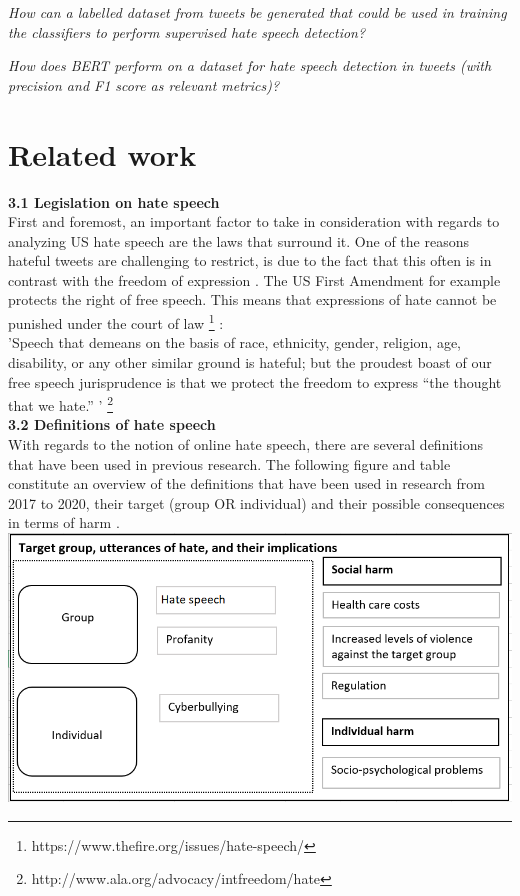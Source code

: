 \documentclass[a4paper,pdf]{article}
\begin{document}
\emph{How can a labelled dataset from tweets be generated that could be used in training the classifiers to perform supervised hate speech detection?}

\emph{How does BERT perform on a dataset for hate speech detection in tweets (with precision and F1 score as relevant metrics)?}

 \section{Related work}
\textbf{3.1 Legislation on hate speech}\\
\break{}
First and foremost, an important factor to take in consideration with regards to analyzing US hate speech are the laws that surround it. One of the reasons hateful tweets are challenging to restrict, is due to the fact that this often is in contrast with the freedom of expression \cite{Brown2018WhatSpeech}. The US First Amendment for example protects the right of free speech. This means that expressions of hate cannot be punished under the court of law \footnote{https://www.thefire.org/issues/hate-speech/} : \\
\break{}
'Speech that demeans on the basis of race, ethnicity, gender, religion, age, disability, or any other similar ground is hateful; but the proudest boast of our free speech jurisprudence is that we protect the freedom to express “the thought that we hate.” ' \footnote{http://www.ala.org/advocacy/intfreedom/hate}\\
\break{}
\textbf{3.2 Definitions of hate speech}\\
\break{}
With regards to the notion of online hate speech, there are several definitions that have been used in previous research. The following figure and table constitute an overview of the definitions that have been used in research from 2017 to 2020, their target (group OR individual) and their possible consequences in terms of harm \cite{Salminen2020DevelopingPlatforms}.\\

\includegraphics{degrees_harm.PNG}\\
\end{document}
